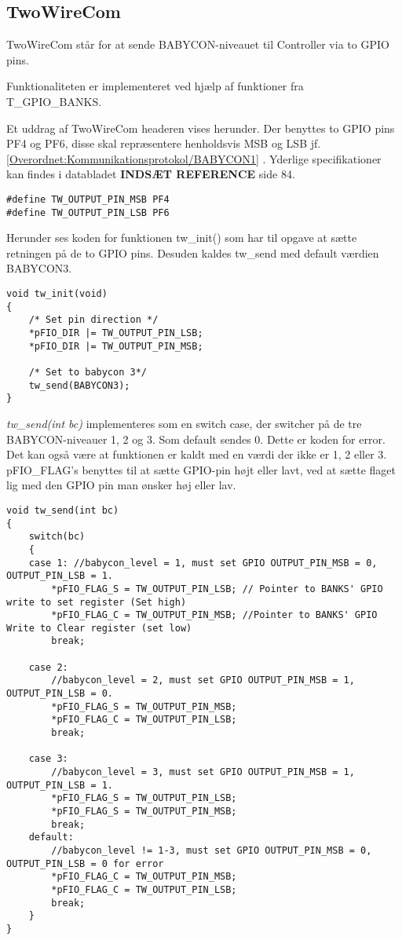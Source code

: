\subsection{TwoWireCom}
TwoWireCom står for at sende BABYCON-niveauet til Controller via to GPIO pins. 

Funktionaliteten er implementeret ved hjælp af funktioner fra T\_GPIO\_BANKS. 

Et uddrag af TwoWireCom headeren vises herunder.
Der benyttes to GPIO pins PF4 og PF6, disse skal repræsentere henholdsvis MSB og LSB jf. \ref{Overordnet:Kommunikationsprotokol/BABYCON1} . Yderlige specifikationer kan findes i databladet \textbf{INDSÆT REFERENCE} side 84. 

\begin{verbatim}
#define TW_OUTPUT_PIN_MSB PF4
#define TW_OUTPUT_PIN_LSB PF6
\end{verbatim}

Herunder ses koden for funktionen tw\_init() som har til opgave at sætte retningen på de to GPIO pins. Desuden kaldes tw\_send med default værdien BABYCON3. 
\begin{verbatim}
void tw_init(void)
{
	/* Set pin direction */
	*pFIO_DIR |= TW_OUTPUT_PIN_LSB;
	*pFIO_DIR |= TW_OUTPUT_PIN_MSB;

	/* Set to babycon 3*/
	tw_send(BABYCON3);
}
\end{verbatim}




\textit{tw\_send(int bc)} implementeres som en switch case, der switcher på de tre BABYCON-niveauer 1, 2 og 3. Som default sendes 0. Dette er koden for error. Det kan også være at funktionen er kaldt med en værdi der ikke er 1, 2 eller 3.  
pFIO\_FLAG's benyttes til at sætte GPIO-pin højt eller lavt, ved at sætte flaget lig med den GPIO pin man ønsker høj eller lav. 

\begin{verbatim}
void tw_send(int bc)
{
	switch(bc)
	{
	case 1:	//babycon_level = 1, must set GPIO OUTPUT_PIN_MSB = 0, OUTPUT_PIN_LSB = 1.
		*pFIO_FLAG_S = TW_OUTPUT_PIN_LSB; // Pointer to BANKS' GPIO write to set register (Set high)
		*pFIO_FLAG_C = TW_OUTPUT_PIN_MSB; //Pointer to BANKS' GPIO Write to Clear register (set low)
		break;

	case 2:
		//babycon_level = 2, must set GPIO OUTPUT_PIN_MSB = 1, OUTPUT_PIN_LSB = 0.
		*pFIO_FLAG_S = TW_OUTPUT_PIN_MSB;
		*pFIO_FLAG_C = TW_OUTPUT_PIN_LSB;
		break;

	case 3:
		//babycon_level = 3, must set GPIO OUTPUT_PIN_MSB = 1, OUTPUT_PIN_LSB = 1.
		*pFIO_FLAG_S = TW_OUTPUT_PIN_LSB;
		*pFIO_FLAG_S = TW_OUTPUT_PIN_MSB;
		break;
	default:
		//babycon_level != 1-3, must set GPIO OUTPUT_PIN_MSB = 0, OUTPUT_PIN_LSB = 0 for error
		*pFIO_FLAG_C = TW_OUTPUT_PIN_MSB;
		*pFIO_FLAG_C = TW_OUTPUT_PIN_LSB;
		break;
	}
}
\end{verbatim}

